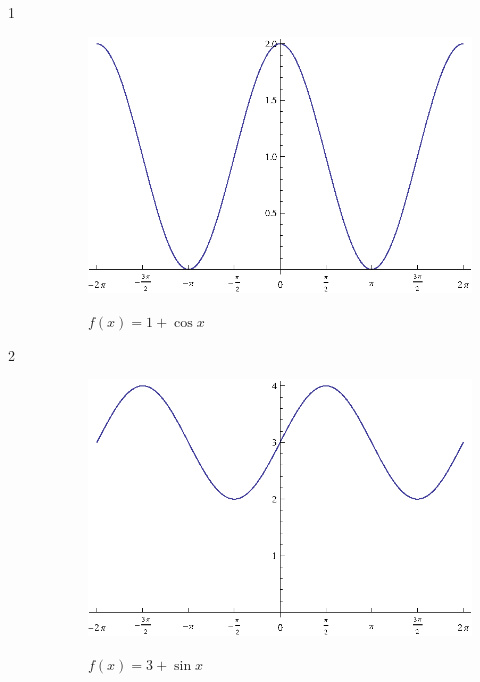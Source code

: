 \documentclass{exam}
\begin{document}
    \begin{description}

      \item[1]
        \begin{figure}[H]
          \centering
          \includegraphics[scale=0.8]{exercise01.eps}

          $f(x) = 1 + \cos x$
        \end{figure}

      \item[2]
        \begin{figure}[H]
          \centering
          \includegraphics[scale=0.8]{exercise02.eps}

          $f(x) = 3 + \sin x$
        \end{figure}


\end{description}
\end{document}
